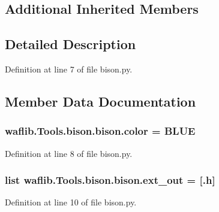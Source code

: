\subsection*{Additional Inherited Members}


\subsection{Detailed Description}


Definition at line 7 of file bison.\+py.



\subsection{Member Data Documentation}
\subsubsection[{\texorpdfstring{color}{color}}]{ waflib.\+Tools.\+bison.\+bison.\+color = \textquotesingle{}B\+L\+UE\textquotesingle{}\hspace{0.3cm}{\ttfamily [static]}}\hypertarget{classwaflib_1_1_tools_1_1bison_1_1bison_a7055770f943ce038eb1d6455b0998645}{}\label{classwaflib_1_1_tools_1_1bison_1_1bison_a7055770f943ce038eb1d6455b0998645}


Definition at line 8 of file bison.\+py.

\subsubsection[{\texorpdfstring{ext\+\_\+out}{ext_out}}]{\setlength{\rightskip}{0pt plus 5cm}list waflib.\+Tools.\+bison.\+bison.\+ext\+\_\+out = \mbox{[}\textquotesingle{}.h\textquotesingle{}\mbox{]}\hspace{0.3cm}{\ttfamily [static]}}\hypertarget{classwaflib_1_1_tools_1_1bison_1_1bison_a31f9eba64362fca0db5dc677a9b1adc4}{}\label{classwaflib_1_1_tools_1_1bison_1_1bison_a31f9eba64362fca0db5dc677a9b1adc4}


Definition at line 10 of file bison.\+py.

